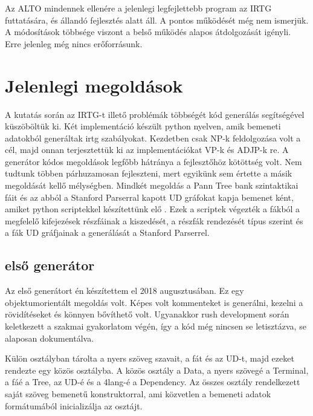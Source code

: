 Az ALTO mindennek ellenére a jelenlegi legfejlettebb program az IRTG futtatására, és állandó fejlesztés alatt áll. A pontos működését még nem ismerjük. A módosítások többsége viszont a belső működés alapos átdolgozását igényli. Erre jelenleg még nincs erőforrásunk.

\section{Jelenlegi megoldások}
\label{sec:solutions}
A kutatás során az IRTG-t illető problémák többségét kód generálás segítségével küszöböltük ki. Két implementáció készült python nyelven, amik bemeneti adatokból generáltak irtg szabályokat. Kezdetben csak NP-k feldolgozása volt a cél, majd onnan terjesztettük ki az implementációkat VP-k és ADJP-k re. A generátor kódos megoldások legfőbb hátránya a fejlesztőhöz kötöttség volt. Nem tudtunk többen párhuzamosan fejleszteni, mert egyikünk sem értette a másik megoldását kellő mélységben.
Mindkét megoldás a Pann Tree bank szintaktikai fáit és az abból a Stanford Parserral kapott UD gráfokat kapja bemenet ként, amiket python scriptekkel készítettünk elő . Ezek a scriptek végezték a fákból a megfelelő kifejezések részfáinak a kiszedését, a részfák rendezését típus szerint és a fák UD gráfjainak a generálását a Stanford Parserrel.


\subsection{első generátor}
\label{sec:generator1}
Az első generátort én készítettem el 2018 augusztusában. Ez egy objektumorientált megoldás volt. Képes volt kommenteket is generálni, kezelni a rövidítéseket és könnyen bővíthető volt. Ugyanakkor rush development során keletkezett a szakmai gyakorlatom végén, így a kód még nincsen se letisztázva, se alaposan dokumentálva.

Külön osztályban tárolta a nyers szöveg szavait, a fát és az UD-t, majd ezeket rendezte egy közös osztályba. A közös osztály a Data, a nyers szövegé a Terminal, a fáé a Tree, az UD-é és a 4lang-é a Dependency. Az összes osztály rendelkezett saját szöveg bemenetű konstruktorral, ami közvetlen a bemeneti adatok formátumából inicializálja az osztájt.


